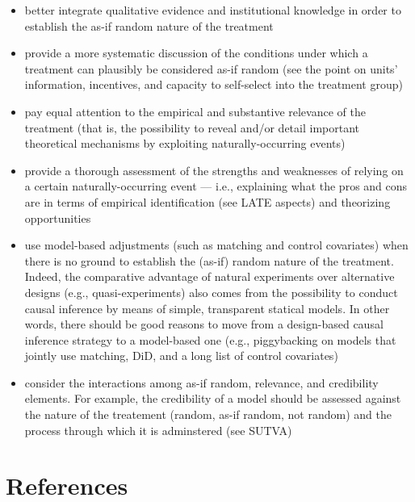 \documentclass[nobib]{tufte-handout}
\begin{document}
\begin{refsection}
\begin{itemize}
    \item better integrate qualitative evidence and institutional knowledge in
        order to establish the as-if random nature of the treatment
    \item provide a more systematic discussion of the conditions under which a
        treatment can plausibly be considered as-if random  (see the point on 
        units' information, incentives, and capacity to self-select into the
        treatment group) 
    \item pay equal attention to the empirical and substantive relevance of the
        treatment (that is, the possibility to reveal and/or detail important 
        theoretical mechanisms by exploiting naturally-occurring events)
    \item provide a thorough assessment of the strengths and weaknesses of 
        relying on a certain naturally-occurring event --- i.e., explaining what
        the pros and cons are in terms of empirical identification (see LATE aspects)
        and theorizing opportunities 
    \item use model-based adjustments (such as matching and control covariates)
        when there is no ground to establish the (as-if) random nature of the 
        treatment. Indeed, the comparative advantage of natural experiments over
        alternative designs (e.g., quasi-experiments) also comes from the 
        possibility to conduct causal inference by means of simple, transparent 
        statical models. In other words, there should be good reasons to
        move from a design-based causal inference strategy to a model-based one
        (e.g., piggybacking on models that jointly use matching, DiD, and a long
        list of control covariates)
    \item consider the interactions among as-if random, relevance, and 
        credibility elements. For example, the credibility of a model should be 
        assessed against the nature of the treatement (random, as-if random, not
        random) and the process through which it is adminstered (see SUTVA)
\end{itemize}

\clearpage
%
\section{References}
\printbibliography[heading=none]
\end{refsection}
\clearpage
\end{document}
